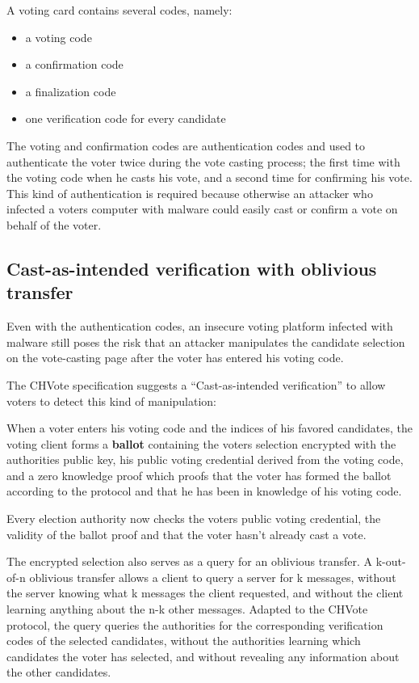 A voting card contains several codes, namely:

\begin{itemize}
	\item a voting code
	\item a confirmation code
	\item a finalization code
	\item one verification code for every candidate
\end{itemize}

The voting and confirmation codes are authentication codes and used to authenticate the voter twice during the vote casting process; the first time with the voting code when he casts his vote, and a second time for confirming his vote. This kind of authentication is required because otherwise an attacker who infected a voters computer with malware could easily cast or confirm a vote on behalf of the voter. 

\subsection{Cast-as-intended verification with oblivious transfer}

Even with the authentication codes, an insecure voting platform infected with malware still poses the risk that an attacker manipulates the candidate selection on the vote-casting page after the voter has entered his voting code. 

The CHVote specification suggests a "`Cast-as-intended verification"' to allow voters to detect this kind of manipulation:

When a voter enters his voting code and the indices of his favored candidates, the voting client forms a \textbf{ballot} containing the voters selection encrypted with the authorities public key, his public voting credential derived from the voting code, and a zero knowledge proof which proofs that the voter has formed the ballot according to the protocol and that he has been in knowledge of his voting code.

Every election authority now checks the voters public voting credential, the validity of the ballot proof and that the voter hasn't already cast a vote. 

The encrypted selection also serves as a query for an oblivious transfer. A k-out-of-n oblivious transfer allows a client to query a server for k messages, without the server knowing what k messages the client requested, and without the client learning anything about the n-k other messages. Adapted to the CHVote protocol, the query queries the authorities for the corresponding verification codes of the selected candidates, without the authorities learning which candidates the voter has selected, and without revealing any information about the other candidates. 

